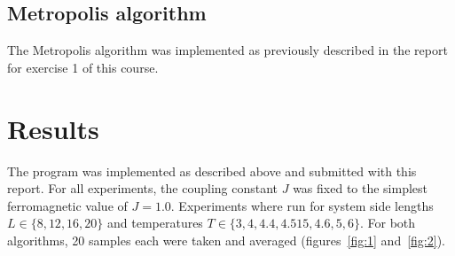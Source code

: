 \documentclass[11pt,a4paper]{article}
\begin{document}
\subsection{Metropolis algorithm}
The Metropolis algorithm was implemented as previously described in the report for exercise 1
of this course.


\section{Results}

The program was implemented as described above and submitted with this report. 
For all experiments, the coupling constant $J$ was fixed to the simplest ferromagnetic value of $J=1.0$. 
Experiments where run for system side lengths $L \in \{8, 12, 16, 20\}$ and temperatures $T \in \{3, 4, 4.4, 4.515, 4.6, 5, 6\}$.
For both algorithms, 20 samples each were taken and averaged (figures~\ref{fig:1} and~\ref{fig:2}).

\end{document}

